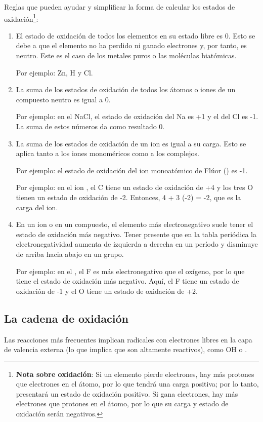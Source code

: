 
Reglas que pueden ayudar y simplificar la forma de calcular los estados de oxidación\footnote{\textbf{Nota sobre oxidación}: Si un elemento pierde electrones, hay más protones que electrones en el átomo, por lo que tendrá una carga positiva; por lo tanto, presentará un estado de oxidación positivo. Si gana electrones, hay más electrones que protones en el átomo, por lo que su carga y estado de oxidación serán negativos.}:
\begin{enumerate}
\item El estado de oxidación de todos los elementos en su estado libre es 0. Esto se debe a que el elemento no ha perdido ni ganado electrones y, por tanto, es neutro. Este es el caso de los metales puros o las moléculas biatómicas.

Por ejemplo: Zn, H y Cl.
\item La suma de los estados de oxidación de todos los átomos o iones de un compuesto neutro es igual a 0.

Por ejemplo: en el NaCl, el estado de oxidación del Na es +1 y el del Cl es -1. La suma de estos números da como resultado 0.
\item La suma de los estados de oxidación de un ion es igual a su carga. Esto se aplica tanto a los iones monoméricos como a los complejos.

Por ejemplo: el estado de oxidación del ion monoatómico de Flúor () es -1.

Por ejemplo: en el ion , el C tiene un estado de oxidación de +4 y los tres O tienen un estado de oxidación de -2. Entonces, 4 + 3 (-2) = -2, que es la carga del ion.
\item En un ion o en un compuesto, el elemento más electronegativo suele tener el estado de oxidación más negativo. Tener presente que en la tabla periódica la electronegatividad aumenta de izquierda a derecha en un período y disminuye de arriba hacia abajo en un grupo.

Por ejemplo: en el , el F es más electronegativo que el oxígeno, por lo que tiene el estado de oxidación más negativo. Aquí, el F tiene un estado de oxidación de -1 y el O tiene un estado de oxidación de +2.
\end{enumerate}

\subsection{La cadena de oxidación}\label{71cox}
Las reacciones más frecuentes implican radicales con electrones libres en la capa de valencia externa (lo que implica que son altamente reactivos), como OH o .

